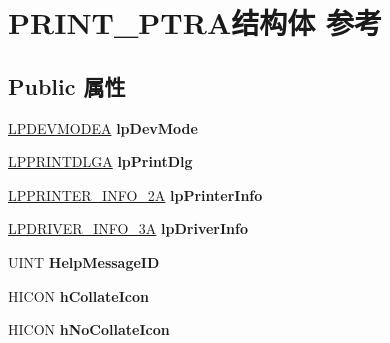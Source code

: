 \hypertarget{struct_p_r_i_n_t___p_t_r_a}{}\section{P\+R\+I\+N\+T\+\_\+\+P\+T\+R\+A结构体 参考}
\label{struct_p_r_i_n_t___p_t_r_a}
\subsection*{Public 属性}
\begin{DoxyCompactItemize}
\item 
\mbox{\label{struct_p_r_i_n_t___p_t_r_a_a55eaa49078058f5b3436cf430462fb4d}} 
\hyperlink{struct__devicemode_a}{L\+P\+D\+E\+V\+M\+O\+D\+EA} {\bfseries lp\+Dev\+Mode}
\item 
\mbox{\label{struct_p_r_i_n_t___p_t_r_a_adf7b225ed010f045a166ebe6cd054968}} 
\hyperlink{structtag_p_d_a}{L\+P\+P\+R\+I\+N\+T\+D\+L\+GA} {\bfseries lp\+Print\+Dlg}
\item 
\mbox{\label{struct_p_r_i_n_t___p_t_r_a_ad826c8cf27ec7fbae45cd8ce2259f5f8}} 
\hyperlink{struct___p_r_i_n_t_e_r___i_n_f_o__2_a}{L\+P\+P\+R\+I\+N\+T\+E\+R\+\_\+\+I\+N\+F\+O\+\_\+2A} {\bfseries lp\+Printer\+Info}
\item 
\mbox{\label{struct_p_r_i_n_t___p_t_r_a_a951fb5c09fce35925772b9d9a58599a8}} 
\hyperlink{struct___d_r_i_v_e_r___i_n_f_o__3_a}{L\+P\+D\+R\+I\+V\+E\+R\+\_\+\+I\+N\+F\+O\+\_\+3A} {\bfseries lp\+Driver\+Info}
\item 
\mbox{\label{struct_p_r_i_n_t___p_t_r_a_a834b37a4abd443adb4a364ff1a506223}} 
U\+I\+NT {\bfseries Help\+Message\+ID}
\item 
\mbox{\label{struct_p_r_i_n_t___p_t_r_a_a31dcb3fc6594ca16f0eb6234616c2596}} 
H\+I\+C\+ON {\bfseries h\+Collate\+Icon}
\item 
\mbox{\label{struct_p_r_i_n_t___p_t_r_a_a7daf15b8543c16703228a48f8e13d95b}} 
H\+I\+C\+ON {\bfseries h\+No\+Collate\+Icon}
\item 

\end{DoxyCompactItemize}
